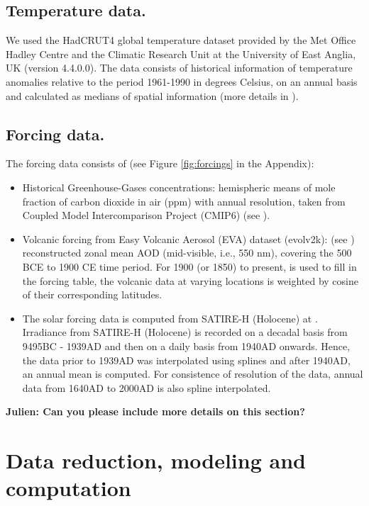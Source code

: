 \documentclass[11pt]{amsart}
\theoremstyle{plain}
\theoremstyle{definition}
\theoremstyle{remark}
\begin{document}
\subsection{Temperature data.}
We used the HadCRUT4 global temperature dataset provided by the Met Office Hadley
Centre and the Climatic Research Unit at the University of East Anglia, UK (version 4.4.0.0). The
data consists of historical information of temperature anomalies relative to the
period 1961-1990 in degrees Celsius, on an annual basis and calculated as
medians of spatial information (more details in \cite{Morice2012}).

\subsection{Forcing data.}
The forcing data consists of (see Figure \ref{fig:forcings} in the Appendix):
\begin{itemize}
\item Historical Greenhouse-Gases concentrations: hemispheric means of mole
  fraction of carbon dioxide in air (ppm) with annual
  resolution, taken from Coupled Model Intercomparison Project (CMIP6) (see
  \cite{Meinshausen2016}).
  
\item Volcanic forcing from Easy Volcanic Aerosol (EVA) dataset (evolv2k): (see
  \cite{Toohey2016}) reconstructed zonal mean AOD (mid-visible, i.e., 550 nm), covering the
  500 BCE to 1900 CE time period. For 1900 (or 1850) to present, \cite{Thomason2016} is
  used to fill in the forcing table, the volcanic data at varying locations is
  weighted by cosine of their corresponding latitudes.
  
\item The solar forcing data is computed from SATIRE-H
  (Holocene) at \cite{Vieira2011}. Irradiance from SATIRE-H (Holocene) is
  recorded on a decadal basis from 9495BC - 1939AD and then on a daily basis
  from 1940AD onwards. Hence, the data prior to 1939AD was interpolated using splines and after 1940AD, an annual mean is computed. For consistence of resolution of the data, annual data from 1640AD to 2000AD is also spline interpolated.
\end{itemize}
\textbf{Julien: Can you please include more details on this section?}

\section{Data reduction, modeling and computation}\label{sec:model}
\end{document}
